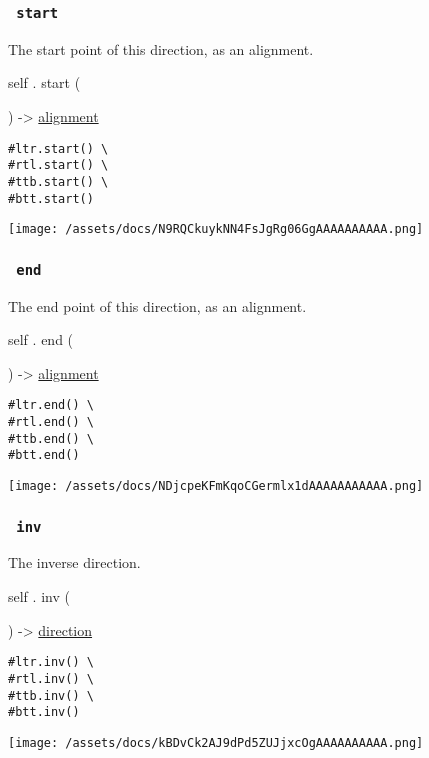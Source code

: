 \subsubsection{\texorpdfstring{\texttt{\ start\ }}{ start }}\label{definitions-start}

The start point of this direction, as an alignment.

self { . } { start } (

) -\textgreater{} \href{/docs/reference/layout/alignment/}{alignment}

\begin{verbatim}
#ltr.start() \
#rtl.start() \
#ttb.start() \
#btt.start()
\end{verbatim}

\texttt{[image: /assets/docs/N9RQCkuykNN4FsJgRg06GgAAAAAAAAAA.png]}

\subsubsection{\texorpdfstring{\texttt{\ end\ }}{ end }}\label{definitions-end}

The end point of this direction, as an alignment.

self { . } { end } (

) -\textgreater{} \href{/docs/reference/layout/alignment/}{alignment}

\begin{verbatim}
#ltr.end() \
#rtl.end() \
#ttb.end() \
#btt.end()
\end{verbatim}

\texttt{[image: /assets/docs/NDjcpeKFmKqoCGermlx1dAAAAAAAAAAA.png]}

\subsubsection{\texorpdfstring{\texttt{\ inv\ }}{ inv }}\label{definitions-inv}

The inverse direction.

self { . } { inv } (

) -\textgreater{} \href{/docs/reference/layout/direction/}{direction}

\begin{verbatim}
#ltr.inv() \
#rtl.inv() \
#ttb.inv() \
#btt.inv()
\end{verbatim}

\texttt{[image: /assets/docs/kBDvCk2AJ9dPd5ZUJjxcOgAAAAAAAAAA.png]}

